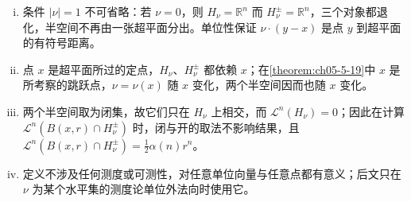 \documentclass[../../main.tex]{subfiles}%
\begin{document}
\begin{remark}\label{remark:ch05-def-5-10-条件}
\begin{enumerate}[(i)]
\item 条件 $\lvert\nu\rvert=1$ 不可省略：若 $\nu=0$，则 $H_\nu=\mathbb{R}^n$ 而 $H_\nu^\pm=\mathbb{R}^n$，三个对象都退化，半空间不再由一张超平面分出。单位性保证 $\nu\cdot(y-x)$ 是点 $y$ 到超平面的有符号距离。
\item 点 $x$ 是超平面所过的定点，$H_\nu$、$H_\nu^\pm$ 都依赖 $x$；在\cref{theorem:ch05-5-19}中 $x$ 是所考察的跳跃点，$\nu=\nu(x)$ 随 $x$ 变化，两个半空间因而也随 $x$ 变化。%
\item 两个半空间取为闭集，故它们只在 $H_\nu$ 上相交，而 $\mathcal{L}^n(H_\nu)=0$；因此在计算 $\mathcal{L}^n(B(x,r)\cap H_\nu^\pm)$ 时，闭与开的取法不影响结果，且 $\mathcal{L}^n(B(x,r)\cap H_\nu^\pm)=\frac12\alpha(n)r^n$。
\item 定义不涉及任何测度或可测性，对任意单位向量与任意点都有意义；后文只在 $\nu$ 为某个水平集的测度论单位外法向时使用它。
\end{enumerate}
\end{remark}
\end{document}
